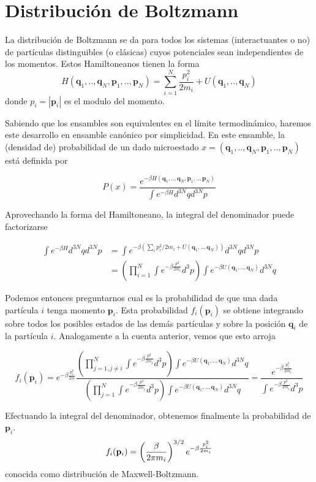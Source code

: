 \section{Distribución de Boltzmann}{\label{ap:boltzmann}}

La distribución de Boltzmann se da para todos los sistemas (interactuantes o no) de partículas distinguibles (o clásicas) cuyos potenciales sean independientes de los momentos.
Estos Hamiltoneanos tienen la forma
\[ H(\mathbf{q}_1,..,\mathbf{q}_N,\mathbf{p}_1,..,\mathbf{p}_N) = \sum_{i=1}^N \frac{p_i^2}{2m_i} + U(\mathbf{q}_1,..,\mathbf{q}_N)\]
donde $p_i = |\mathbf{p}_i|$ es el modulo del momento.

Sabiendo que los ensambles son equivalentes en el límite termodinámico, haremos este desarrollo en ensamble canónico por simplicidad.
En este ensamble, la (densidad de) probabilidad de un dado microestado $x=(\mathbf{q}_1,..,\mathbf{q}_N,\mathbf{p}_1,..,\mathbf{p}_N)$ está definida por

\[ P(x) = \frac{e^{-\beta H(\mathbf{q}_1,..,\mathbf{q}_N,\mathbf{p}_1,..,\mathbf{p}_N)}}{\int e^{-\beta H} d^{3N}qd^{3N}p} \]

Aprovechando la forma del Hamiltoneano, la integral del denominador puede factorizarse

\begin{align*}
\int e^{-\beta H} d^{3N}qd^{3N}p &= \int e^{-\beta \left( \sum_i p_i^2/2m_i + U(\mathbf{q}_1,..,\mathbf{q}_N)\right)} d^{3N}qd^{3N}p \\
&= \left(\prod_{i=1}^N\int e^{-\beta\frac{p^2}{2m_i}} d^{3}p\right) \int e^{-\beta U(\mathbf{q}_1,..,\mathbf{q}_N)} d^{3N}q
\end{align*}

Podemos entonces preguntarnos cual es la probabilidad de que una dada partícula $i$ tenga momento $\mathbf{p}_i$.
Esta probabilidad $f_i(\mathbf{p}_i)$ se obtiene integrando sobre todos los posibles estados de las demás partículas y sobre la posición $\mathbf{q}_i$ de la partícula $i$.
Analogamente a la cuenta anterior, vemos que esto arroja

\[ f_i(\mathbf{p}_i) = e^{-\beta\frac{p_i^2}{2m}}\frac{\left(\prod_{j=1, j\neq i}^N\int e^{-\beta\frac{p^2}{2m_j}} d^{3}p\right) \int e^{-\beta U(\mathbf{q}_1,..,\mathbf{q}_N)} d^{3N}q}
{\left(\prod_{j=1}^N\int e^{-\beta\frac{p^2}{2m_j}} d^{3}p\right) \int e^{-\beta U(\mathbf{q}_1,..,\mathbf{q}_N)} d^{3N}q}
= \frac{e^{-\beta\frac{p_i^2}{2m_i}}}{\int e^{-\beta\frac{p^2}{2m_i}} d^3p} \]

Efectuando la integral del denominador, obtenemos finalmente la probabilidad de $\mathbf{p}_i$.
\begin{equation}{\label{eq:dist_MB_imp}}
f_i(\mathbf{p}_i) = \left(\frac{\beta}{2\pi m_i} \right)^{3/2} e^{-\beta\frac{p_i^2}{2m_i}}
\end{equation}
conocida como distribución de Maxwell-Boltzmann.

